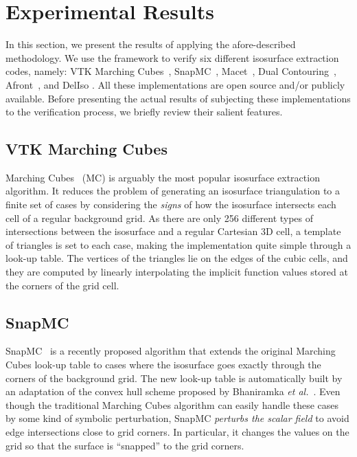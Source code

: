 \section{Experimental Results}
\label{chap1:sec:res}

In this section, we present the results of applying the afore-described 
methodology. We use the framework to verify six different isosurface 
extraction codes, namely: VTK Marching Cubes~\cite{lor87},
SnapMC~\cite{Raman:2008:QIM}, Macet~\cite{Dietrich:TVCG:2008},
Dual Contouring~\cite{Ju:2002:DCH:566654.566586}, Afront~\cite{Schreiner06},
and DelIso \cite{Dey07}. All these
implementations are open source and/or publicly 
available. Before presenting the actual results of subjecting these
implementations to the verification process,
we briefly review their salient features.

\subsection{VTK Marching Cubes} Marching Cubes~\cite{lor87} (MC) is
arguably the most popular isosurface extraction algorithm.
It reduces the problem of generating an isosurface triangulation
to a finite set of cases by considering the \emph{signs} of 
how the isosurface intersects each cell of a regular background grid.
As there are only 256 different
types of intersections between the isosurface and a regular Cartesian 3D cell, 
a template of triangles is set to each case, making the implementation quite simple 
through a look-up table. The vertices of the triangles lie on 
the edges of the cubic cells, and they are computed by linearly interpolating 
the implicit function values stored at the corners of the grid cell. 

\subsection{SnapMC} SnapMC~\cite{Raman:2008:QIM} is a recently proposed algorithm
that extends the original Marching Cubes look-up table to cases where
the isosurface goes exactly through the corners of the background
grid.  The new look-up table is automatically built by an adaptation of
the convex hull scheme proposed by
Bhaniramka {\em et al.}~\cite{bhaniramka04}. Even though the traditional Marching
Cubes algorithm can easily handle these cases by some kind of symbolic
perturbation, SnapMC \emph{perturbs the scalar field} to avoid edge
intersections close to grid corners. In particular, it changes
the values on the grid so that the surface is ``snapped'' to the grid
corners.

